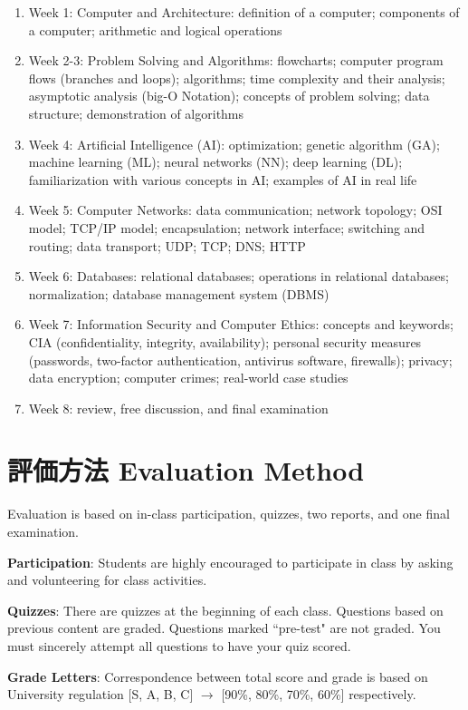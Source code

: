 \documentclass{article}
\begin{document}
\begin{enumerate}
    \item Week 1: Computer and Architecture: definition of a computer; components of a computer; arithmetic and logical operations
    \item Week 2-3: Problem Solving and Algorithms: flowcharts; computer program flows (branches and loops); algorithms; time complexity and their analysis; asymptotic analysis (big-O Notation); concepts of problem solving; data structure; demonstration of algorithms
    \item Week 4: Artificial Intelligence (AI): optimization; genetic algorithm (GA); machine learning (ML); neural networks (NN); deep learning (DL); familiarization with various concepts in AI; examples of AI in real life
    \item Week 5: Computer Networks: data communication; network topology; OSI model; TCP/IP model; encapsulation; network interface; switching and routing; data transport; UDP; TCP; DNS; HTTP
    \item Week 6: Databases: relational databases; operations in relational databases; normalization; database management system (DBMS)
    \item Week 7: Information Security and Computer Ethics: concepts and keywords; CIA (confidentiality, integrity, availability); personal security measures (passwords, two-factor authentication, antivirus software, firewalls); privacy; data encryption; computer crimes; real-world case studies
    \item Week 8: review, free discussion, and final examination
\end{enumerate}

\section{評価方法 Evaluation Method}
Evaluation is based on in-class participation, quizzes, two reports, and one final examination.

\smallskip\noindent
\textbf{Participation}: Students are highly encouraged to participate in class by asking and volunteering for class activities.

\smallskip\noindent
\textbf{Quizzes}: There are quizzes at the beginning of each class. Questions based on previous content are graded. Questions marked ``pre-test" are not graded. You must sincerely attempt all questions to have your quiz scored.

\smallskip\noindent
\textbf{Grade Letters}: Correspondence between total score and grade is based on University regulation [S, A, B, C] $\rightarrow$ [90\%, 80\%, 70\%, 60\%] respectively.
\end{document}
